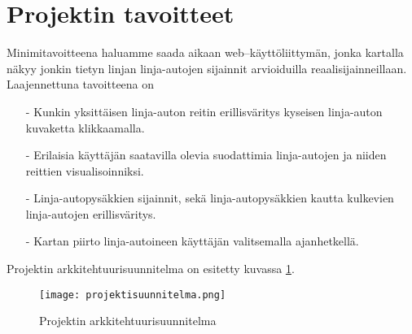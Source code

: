 \documentclass[a4paper, twoside, finnish, english, 12pt]{article}
\begin{document}
\section{Projektin tavoitteet}
Minimitavoitteena haluamme saada aikaan web--käyttöliittymän, jonka kartalla näkyy jonkin tietyn linjan linja-autojen sijainnit arvioiduilla reaalisijainneillaan. 
Laajennettuna tavoitteena on 
\begin{itemize}
\item[-] Kunkin yksittäisen linja-auton reitin erillisväritys kyseisen linja-auton kuvaketta klikkaamalla. 
\item[-] Erilaisia käyttäjän saatavilla olevia suodattimia linja-autojen ja niiden reittien visualisoinniksi. 
\item[-] Linja-autopysäkkien sijainnit, sekä linja-autopysäkkien kautta kulkevien linja-autojen erillisväritys. 
\item[-] Kartan piirto linja-autoineen käyttäjän valitsemalla ajanhetkellä. 
\end{itemize}
Projektin arkkitehtuurisuunnitelma on esitetty kuvassa \ref{fig:arkkitehtuurisuunnitelma}. 


\begin{figure}[h]
\centering
\texttt{[image: projektisuunnitelma.png]}
\caption{Projektin arkkitehtuurisuunnitelma}
\label{fig:arkkitehtuurisuunnitelma}
\end{figure}

%
\end{document}

